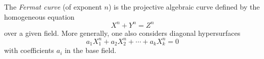 The \textit{Fermat curve} (of exponent $n$) is the projective algebraic curve defined by the homogeneous equation
$$X^n + Y^n = Z^n$$
over a given field. More generally, one also considers diagonal hypersurfaces
$$a_1 X_1^n + a_2 X_2^n + \cdots + a_k X_k^n = 0$$
with coefficients $a_i$ in the base field.
